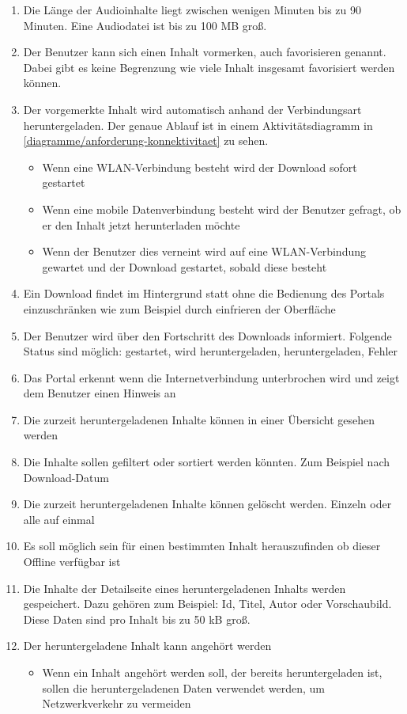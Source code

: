 \begin{enumerate}
    \item Die Länge der Audioinhalte liegt zwischen wenigen Minuten bis zu 90 Minuten. Eine Audiodatei ist bis zu 100 \ac{MB} groß. 
	\item Der Benutzer kann sich einen Inhalt vormerken, auch favorisieren genannt. Dabei gibt es keine Begrenzung wie viele Inhalt insgesamt favorisiert werden können. 
	\item Der vorgemerkte Inhalt wird automatisch anhand der Verbindungsart heruntergeladen. Der genaue Ablauf ist in einem Aktivitätsdiagramm in \autoref{diagramme/anforderung-konnektivitaet} zu sehen.
	
	\begin{itemize}
		\item Wenn eine WLAN-Verbindung besteht wird der Download sofort gestartet
		\item Wenn eine mobile Datenverbindung besteht wird der Benutzer gefragt, ob er den Inhalt jetzt herunterladen möchte
		\item Wenn der Benutzer dies verneint wird auf eine WLAN-Verbindung gewartet und der Download gestartet, sobald diese besteht
	\end{itemize}
	

	\item Ein Download findet im Hintergrund statt ohne die Bedienung des Portals einzuschränken wie zum Beispiel durch einfrieren der Oberfläche
	\item Der Benutzer wird über den Fortschritt des Downloads informiert. Folgende Status sind möglich: gestartet, wird heruntergeladen, heruntergeladen, Fehler
	\item Das Portal erkennt wenn die Internetverbindung unterbrochen wird und zeigt dem Benutzer einen Hinweis an
	\item Die zurzeit heruntergeladenen Inhalte können in einer Übersicht gesehen werden
	\item Die Inhalte sollen gefiltert oder sortiert werden könnten. Zum Beispiel nach Download-Datum
 	\item Die zurzeit heruntergeladenen Inhalte können gelöscht werden. Einzeln oder alle auf einmal
	\item Es soll möglich sein für einen bestimmten Inhalt herauszufinden ob dieser Offline verfügbar ist
	\item Die Inhalte der Detailseite eines heruntergeladenen Inhalts werden gespeichert. Dazu gehören zum Beispiel: Id, Titel, Autor oder Vorschaubild. Diese Daten sind pro Inhalt bis zu 50 \ac{kB} groß.
	\item Der heruntergeladene Inhalt kann angehört werden
	\begin{itemize}
		\item Wenn ein Inhalt angehört werden soll, der bereits heruntergeladen ist, sollen die heruntergeladenen Daten verwendet werden, um Netzwerkverkehr zu vermeiden
	\end{itemize}
	
\end{enumerate}

